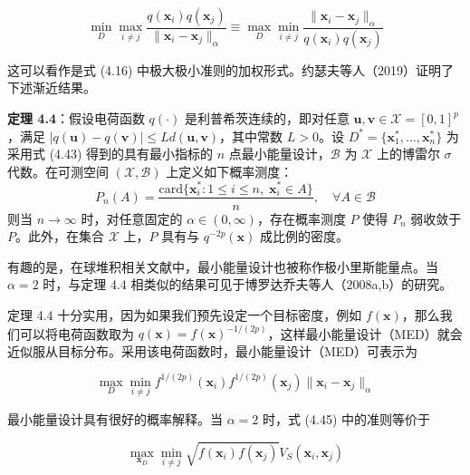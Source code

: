 \documentclass{ctexart}
\begin{document}
\begin{equation*}
\min_{D}\max_{i\neq j}\frac{q(\boldsymbol{x}_i)q(\boldsymbol{x}_j)}{\|\boldsymbol{x}_i-\boldsymbol{x}_j\|_\alpha}\equiv\max_{D}\min_{i\neq j}\frac{\|\boldsymbol{x}_i-\boldsymbol{x}_j\|_\alpha}{q(\boldsymbol{x}_i)q(\boldsymbol{x}_j)}
\tag{4.43}
\end{equation*}

这可以看作是式 (4.16) 中极大极小准则的加权形式。约瑟夫等人（2019）证明了下述渐近结果。

\begin{mdquote}
\textbf{定理 4.4}：假设电荷函数 $q(\cdot)$ 是利普希茨连续的，即对任意 $\boldsymbol{u},\boldsymbol{v}\in \mathcal{X}=[0,1]^p$，满足 $|q(\boldsymbol{u})-q(\boldsymbol{v})|\le Ld(\boldsymbol{u},\boldsymbol{v})$，其中常数 $L>0$。设 $D^*=\{\boldsymbol{x}^*_1,\dots,\boldsymbol{x}^*_n\}$ 为采用式 (4.43) 得到的具有最小指标的 $n$ 点最小能量设计，$\mathscr{B}$ 为 $\mathcal{X}$ 上的博雷尔 $\sigma$ 代数。在可测空间 $(\mathcal{X},\mathscr{B})$ 上定义如下概率测度：\begin{equation*}
P_n(A)=\frac{\mathrm{card}\{\boldsymbol{x}^*_i:1\le i\le n,\;\boldsymbol{x}^*_i\in A\}}{n},\quad \forall A\in \mathscr{B}\tag{4.44}
\end{equation*} 则当 $n\to\infty$ 时，对任意固定的 $\alpha\in(0,\infty)$，存在概率测度 $P$ 使得 $P_n$ 弱收敛于 $P$。此外，在集合 $\mathcal{X}$ 上，$P$ 具有与 $q^{-2p}(\boldsymbol{x})$ 成比例的密度。
\end{mdquote}

有趣的是，在球堆积相关文献中，最小能量设计也被称作极小里斯能量点。当 $\alpha = 2$ 时，与定理 4.4 相类似的结果可见于博罗达乔夫等人（2008a,b）的研究。

定理 4.4 十分实用，因为如果我们预先设定一个目标密度，例如 $f(\boldsymbol{x})$，那么我们可以将电荷函数取为 $q(\boldsymbol{x})=f(\boldsymbol{x})^{-1/(2p)}$，这样最小能量设计（MED）就会近似服从目标分布。采用该电荷函数时，最小能量设计（MED）可表示为

\begin{equation*}
\max_{D}\min_{i\neq j} f^{1/(2p)}(\boldsymbol{x}_i)f^{1/(2p)}(\boldsymbol{x}_j)\|\boldsymbol{x}_i-\boldsymbol{x}_j\|_\alpha
\tag{4.45}
\end{equation*}

最小能量设计具有很好的概率解释。当 $\alpha=2$ 时，式 (4.45) 中的准则等价于

\begin{equation*}
\max_{\boldsymbol{x}_{D}}\min_{i\neq j}\sqrt{f(\boldsymbol{x}_i)f(\boldsymbol{x}_j)}V_S(\boldsymbol{x}_i,\boldsymbol{x}_j)
\end{equation*}
\end{document}
